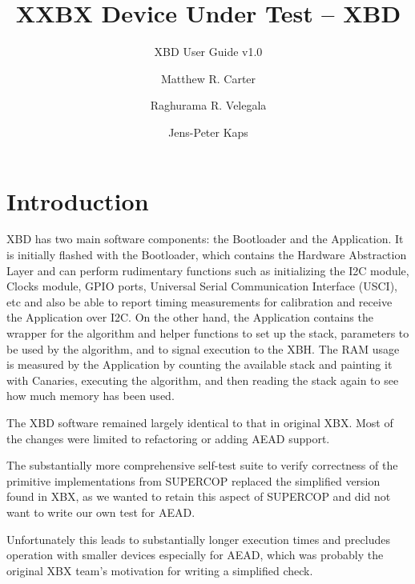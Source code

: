 \documentclass[twoside,11pt]{cergdoc}
\begin{document}
\title{XXBX Device Under Test -- XBD}
\subtitle{XBD User Guide v1.0}
\author{Matthew R. Carter \and Raghurama R. Velegala \and Jens-Peter Kaps}

\maketitle

\tableofcontents

\chapter{Introduction}
XBD has two main software components: the Bootloader and
the Application. It is initially flashed with the Bootloader, which
contains the Hardware Abstraction Layer and can perform
rudimentary functions such as initializing the I2C module,
Clocks module, GPIO ports, Universal Serial Communication
Interface (USCI), etc and also be able to report timing
measurements for calibration and receive the Application over
I2C.
On the other hand, the Application contains the wrapper for the
algorithm and helper functions to set up the stack, parameters to
be used by the algorithm, and to signal execution to the XBH.
The RAM usage is measured by the Application by counting the
available stack and painting it with Canaries, executing the
algorithm, and then reading the stack again to see how much
memory has been used.






The XBD software remained largely identical to that in original XBX. Most of the
changes were limited to refactoring or adding AEAD support. 

The substantially more comprehensive self-test suite to verify correctness of
the primitive implementations from SUPERCOP replaced the simplified version
found in XBX, as we wanted to retain this aspect of SUPERCOP and did not want to
write our own test for AEAD. 

Unfortunately this leads to substantially longer
execution times and precludes operation with smaller devices especially for
AEAD, which was probably the original XBX team's motivation for writing a
simplified check. 
\end{document}
